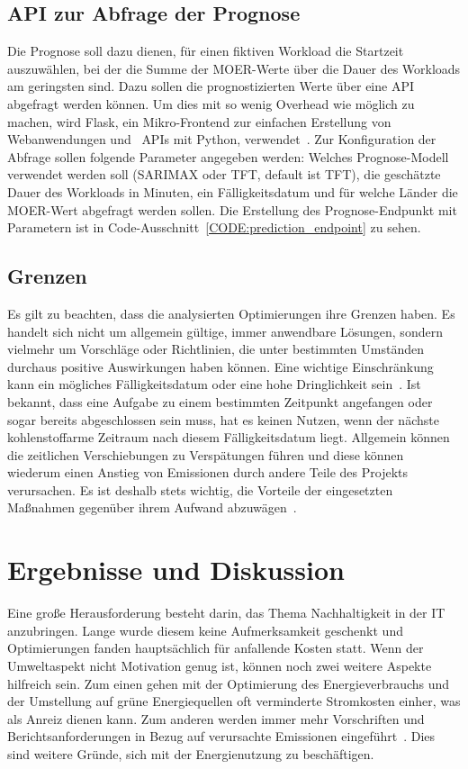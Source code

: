 \section{API zur Abfrage der Prognose}
Die Prognose soll dazu dienen, für einen fiktiven Workload die Startzeit auszuwählen, bei der die Summe der \ac{MOER}-Werte über die Dauer des Workloads am geringsten sind.
Dazu sollen die prognostizierten Werte über eine \ac{API} abgefragt werden können.
Um dies mit so wenig Overhead wie möglich zu machen, wird Flask, ein Mikro-Frontend zur einfachen Erstellung von Webanwendungen und ~\ac{API}s mit Python, verwendet~\cite{.20240203T21:13:11.000Z}.
Zur Konfiguration der Abfrage sollen folgende Parameter angegeben werden: Welches Prognose-Modell verwendet werden soll (SARIMAX oder \ac{TFT}, default ist \ac{TFT}), die geschätzte Dauer des Workloads in Minuten, ein Fälligkeitsdatum und für welche Länder die \ac{MOER}-Wert abgefragt werden sollen.
Die Erstellung des Prognose-Endpunkt mit Parametern ist in Code-Ausschnitt~\ref{CODE:prediction_endpoint} zu sehen.


\section{Grenzen}
Es gilt zu beachten, dass die analysierten Optimierungen ihre Grenzen haben.
Es handelt sich nicht um allgemein gültige, immer anwendbare Lösungen, sondern vielmehr um Vorschläge oder Richtlinien, die unter bestimmten Umständen durchaus positive Auswirkungen haben können.
Eine wichtige Einschränkung kann ein mögliches Fälligkeitsdatum oder eine hohe Dringlichkeit sein~\cite{Dodge.06212022}.
Ist bekannt, dass eine Aufgabe zu einem bestimmten Zeitpunkt angefangen oder sogar bereits abgeschlossen sein muss, hat es keinen Nutzen, wenn der nächste kohlenstoffarme Zeitraum nach diesem Fälligkeitsdatum liegt.
Allgemein können die zeitlichen Verschiebungen zu Verspätungen führen und diese können wiederum einen Anstieg von Emissionen durch andere Teile des Projekts verursachen.
Es ist deshalb stets wichtig, die Vorteile der eingesetzten Maßnahmen gegenüber ihrem Aufwand abzuwägen~\cite{Dodge.06212022}.

\chapter{Ergebnisse und Diskussion}
Eine große Herausforderung besteht darin, das Thema Nachhaltigkeit in der \ac{IT} anzubringen.
Lange wurde diesem keine Aufmerksamkeit geschenkt und Optimierungen fanden hauptsächlich für anfallende Kosten statt.
Wenn der Umweltaspekt nicht Motivation genug ist, können noch zwei weitere Aspekte hilfreich sein.
Zum einen gehen mit der Optimierung des Energieverbrauchs und der Umstellung auf grüne Energiequellen oft verminderte Stromkosten einher, was als Anreiz dienen kann.
Zum anderen werden immer mehr Vorschriften und Berichtsanforderungen in Bezug auf verursachte Emissionen eingeführt~\cite{GreenSoftwareFoundation.2023}.
Dies sind weitere Gründe, sich mit der Energienutzung zu beschäftigen.

